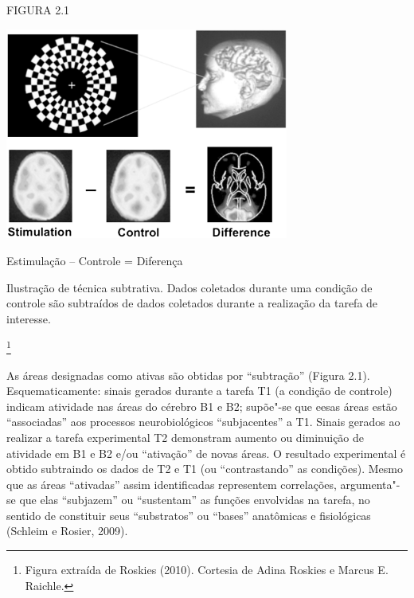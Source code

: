\begin{center}
\footnotesize{FIGURA 2.1

\includegraphics[width=3.67012in,height=2.7367in]{imgs/1.png}

Estimulação -- Controle = Diferença

Ilustração de técnica subtrativa. Dados coletados durante uma condição
de controle são subtraídos de dados coletados durante a realização da
tarefa de interesse.}\footnote[10]{Figura extraída de Roskies (2010). Cortesia
de Adina Roskies e Marcus E. Raichle.}
\end{center}

As áreas designadas como ativas são obtidas por ``subtração'' (Figura
2.1). Esquematicamente: sinais  gerados durante a tarefa T1 (a
condição de controle) indicam atividade nas áreas do cérebro B1 e B2;
supõe"-se que eesas áreas estão ``associadas'' aos processos
neurobiológicos ``subjacentes'' a T1. Sinais  gerados ao realizar a
tarefa experimental T2 demonstram aumento ou diminuição de atividade em
B1 e B2 e/ou ``ativação'' de novas áreas. O resultado experimental é
obtido subtraindo os dados de T2 e T1 (ou ``contrastando'' as
condições). Mesmo que as áreas ``ativadas'' assim identificadas
representem correlações, argumenta"-se que elas ``subjazem'' ou
``sustentam'' as funções envolvidas na tarefa, no sentido de constituir
seus ``substratos'' ou ``bases'' anatômicas e fisiológicas (Schleim e
Rosier, 2009).

